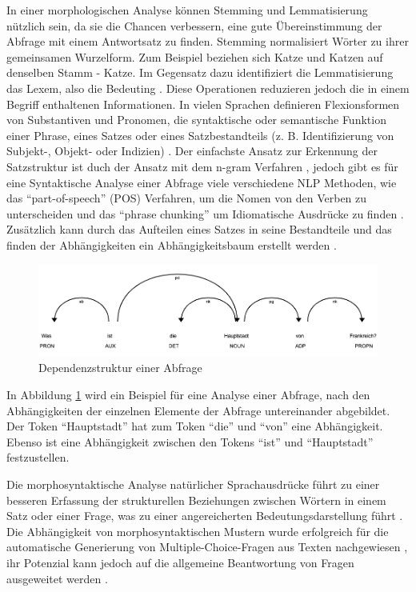 \documentclass[
        ngerman,
        paper=a4,
        numbers=noendperiod,
]{scrreprt}
\begin{document}
In einer morphologischen Analyse können Stemming und Lemmatisierung nützlich sein, da sie die Chancen verbessern, eine gute Übereinstimmung der Abfrage mit einem Antwortsatz zu finden. Stemming normalisiert Wörter zu ihrer gemeinsamen Wurzelform. Zum Beispiel beziehen sich Katze und Katzen auf denselben Stamm - Katze. Im Gegensatz dazu identifiziert die Lemmatisierung das Lexem, also die Bedeuting \citep[S. 5419]{Kolomiyets2011APerspective}. Diese Operationen reduzieren jedoch die in einem Begriff enthaltenen Informationen. In vielen Sprachen definieren Flexionsformen von Substantiven und Pronomen, die syntaktische oder semantische Funktion einer Phrase, eines Satzes oder eines Satzbestandteils (z. B. Identifizierung von Subjekt-, Objekt- oder Indizien) \citep{nivre2006maltparser}. Der einfachste Ansatz zur Erkennung der Satzstruktur ist duch der Ansatz mit dem n-gram Verfahren \citep{brill2002analysis}, jedoch gibt es für eine Syntaktische Analyse einer Abfrage viele verschiedene NLP Methoden, wie das \enquote{part-of-speech} (POS) Verfahren, um die Nomen von den Verben zu unterscheiden und das \enquote{phrase chunking} um Idiomatische Ausdrücke zu finden \citep[S. 5419]{Kolomiyets2011APerspective}. Zusätzlich kann durch das Aufteilen eines Satzes in seine Bestandteile und das finden der Abhängigkeiten ein Abhängigkeitsbaum erstellt werden \citep{cui2005question}.  

\begin{figure}[H]
\centering\includegraphics[width=0.9\linewidth]{images/dep.png}
\caption[Dependenzstruktur einer Frage]{Dependenzstruktur einer Abfrage}
\label{fig:dep}
\end{figure}

In Abbildung \ref{fig:dep} wird ein Beispiel für eine Analyse einer Abfrage, nach den Abhängigkeiten der einzelnen Elemente der Abfrage untereinander abgebildet. Der Token \enquote{Hauptstadt} hat zum Token \enquote{die} und \enquote{von} eine Abhängigkeit. Ebenso ist eine Abhängigkeit zwischen den Tokens \enquote{ist} und \enquote{Hauptstadt} festzustellen.

Die morphosyntaktische Analyse natürlicher Sprachausdrücke führt zu einer besseren Erfassung der strukturellen Beziehungen zwischen
Wörtern in einem Satz oder einer Frage, was zu einer angereicherten Bedeutungsdarstellung führt \citep[S. 5420]{Kolomiyets2011APerspective}. Die Abhängigkeit von morphosyntaktischen Mustern wurde erfolgreich für die automatische Generierung von Multiple-Choice-Fragen aus Texten nachgewiesen \citep{mitkov2006computer}, ihr Potenzial kann jedoch auf die allgemeine Beantwortung von Fragen ausgeweitet werden \citep[S. 5420]{Kolomiyets2011APerspective}.
\end{document}
